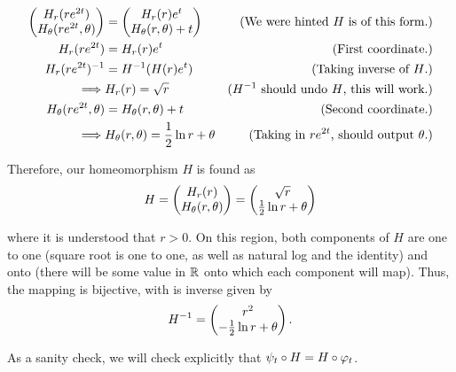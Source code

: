 \begin{solution}
    \alignbreak
    \begin{align}
        \begin{pmatrix}H_r(re^{2t})\\ H_\theta(re^{2t}, \theta)\end{pmatrix} &= \begin{pmatrix}H_r(r)e^t\\H_\theta(r, \theta)+ t\end{pmatrix} &\text{(We were hinted $H$ is of this form.)}\nonumber\\
        H_r(re^{2t}) &= H_r(r)e^t &\text{(First coordinate.)}\nonumber\\
        H_r(re^{2t})^{-1}&= H^{-1}(H(r)e^t) &\text{(Taking inverse of $H$.)}\nonumber\\
        \implies& H_r(r) = \sqrt{r} &\text{($H^{-1}$ should undo $H$, this will work.)}\nonumber\\
        H_\theta(re^{2t}, \theta) &= H_\theta(r, \theta) + t &\text{(Second coordinate.)}\nonumber\\
        \implies& H_\theta(r, \theta) = \frac{1}{2}\ln r + \theta &\text{(Taking in $re^{2t}$, should output $\theta$.)}\nonumber
    \end{align}
    \alignbreak

    Therefore, our homeomorphism $H$ is found as 
    \[
    H = \begin{pmatrix}H_r(r)\\H_\theta(r, \theta)\end{pmatrix} = \begin{pmatrix}\sqrt{r}\\ \frac{1}{2}\ln r + \theta\end{pmatrix}
    \]

    where it is understood that $r > 0$. On this region, both components of $H$ are one to one (square root is one to one, as well as natural log and the identity) and onto (there will be some value in $\mathbb{R}$ onto which each component will map). Thus, the mapping is bijective, with is inverse given by 
    \[
    H^{-1} = \begin{pmatrix}r^2\\ -\frac{1}{2}\ln r + \theta\end{pmatrix}.
    \]

    As a sanity check, we will check explicitly that $\psi_t \circ H = H \circ \varphi_t$.


\end{solution}
